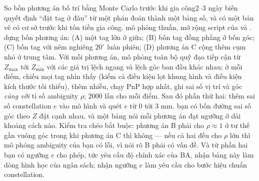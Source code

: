 \documentclass[../../marker.tex]{subfiles}
\begin{document}
\begin{ungdung}
\end{ungdung}

\begin{duan}{So bốn phương án bố trí bằng Monte Carlo trước khi gia công}{2--3 ngày}
\dmt biến quyết định ``đặt tag ở đâu'' từ một phán đoán thành một bảng số, và có một bản vẽ có cơ sở trước khi tốn tiền gia công.
\ddl mô phỏng thuần, mở rộng script của  và .
\dbc dựng bốn phương án: (A) một tag lớn ở giữa; (B) bốn tag đồng phẳng ở bốn góc; (C) bốn tag với nêm nghiêng \(20^\circ\) luân phiên; (D) phương án C cộng thêm cụm nhỏ ở trung tâm. Với mỗi phương án, mô phỏng toàn bộ quỹ đạo tiếp cận từ \(Z_{\max}\) tới \(Z_{\min}\) với các giá trị lệch ngang và lệch góc ban đầu khác nhau; ở mỗi điểm, chiếu mọi tag nhìn thấy (kiểm cả điều kiện lọt khung hình và điều kiện kích thước tối thiểu), thêm nhiễu, chạy PnP hợp nhất, ghi sai số vị trí và góc \emph{cùng với} tỉ số ambiguity \(\rho\); 2000 lần cho mỗi điểm. Sau đó phần thứ hai: thêm sai số constellation \(e\) vào mô hình và quét \(e\) từ 0 tới 3 mm.
\dxk bạn có bốn đường sai số góc theo \(Z\) đặt cạnh nhau, và một bảng nói mỗi phương án đạt ngưỡng ở dải khoảng cách nào. Kiểm tra chéo bắt buộc: phương án B phải cho \(\rho \approx 1\) ở tư thế gần vuông góc trong khi phương án C thì không --- nếu cả hai đều cho \(\rho\) lớn thì mô phỏng ambiguity của bạn có lỗi, vì  nói rõ B phải có vấn đề. Và từ phần hai bạn có ngưỡng \(e\) cho phép, tức yêu cầu độ chính xác của BA.
\dnv {} nhận bảng này làm dòng hình học của ngân sách;  nhận ngưỡng \(e\) làm yêu cầu cho bước hiệu chuẩn constellation.
\end{duan}
\end{document}

